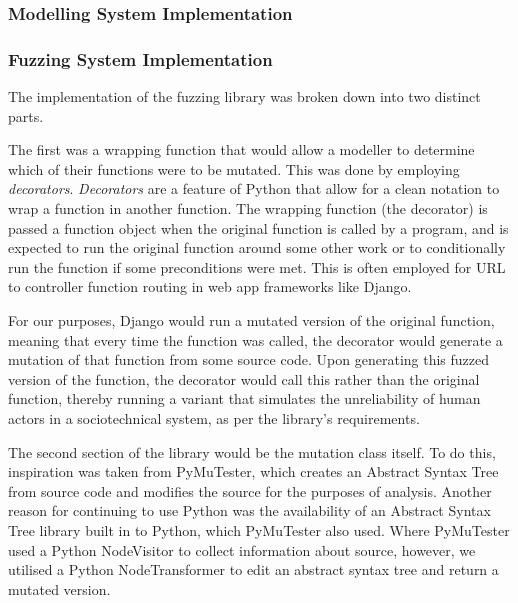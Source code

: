 \subsubsection{Modelling System Implementation}\label{planning_modelling_implementation}



\subsubsection{Fuzzing System Implementation}\label{planning_fuzzing_implementation}
The implementation of the fuzzing library was broken down into two distinct parts. \par
The first was a wrapping function that would allow a modeller to determine which of their functions were to be mutated. This was done by employing \emph{decorators}. \emph{Decorators} are a feature of Python that allow for a clean notation to wrap a function in another function. The wrapping function (the decorator) is passed a function object when the original function is called by a program, and is expected to run the original function around some other work or to conditionally run the function if some preconditions were met. This is often employed for URL to controller function routing in web app frameworks like Django. \par%
For our purposes, Django would run a mutated version of the original function, meaning that every time the function was called, the decorator would generate a mutation of that function from some source code. Upon generating this fuzzed version of the function, the decorator would call this rather than the original function, thereby running a variant that simulates the unreliability of human actors in a sociotechnical system, as per the library's requirements. \par
The second section of the library would be the mutation class itself. To do this, inspiration was taken from PyMuTester, which creates an Abstract Syntax Tree from source code and modifies the source for the purposes of analysis. Another reason for continuing to use Python was the availability of an Abstract Syntax Tree library built in to Python, which PyMuTester also used. Where PyMuTester used a Python NodeVisitor to collect information about source, however, we utilised a Python NodeTransformer to edit an abstract syntax tree and return a mutated version. \par%
